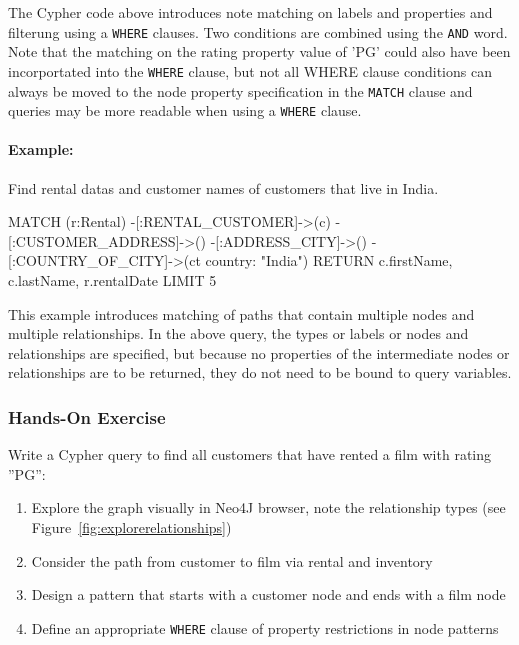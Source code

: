 The Cypher code above introduces note matching on labels and properties and filterung using a \texttt{WHERE} clauses. Two conditions are combined using the \texttt{AND} word. Note that the matching on the rating property value of 'PG' could also have been incorportated into the \texttt{WHERE} clause, but not all WHERE clause conditions can always be moved to the node property specification in the \texttt{MATCH} clause and queries may be more readable when using a \texttt{WHERE} clause. 

\paragraph*{Example:} Find rental datas and customer names of customers that live in India.

\begin{samepage}
\begin{cyphercode}
MATCH (r:Rental) 
        -[:RENTAL_CUSTOMER]->(c) 
        -[:CUSTOMER_ADDRESS]->() 
        -[:ADDRESS_CITY]->()
        -[:COUNTRY_OF_CITY]->(ct {country: "India"})
RETURN c.firstName, c.lastName, r.rentalDate LIMIT 5
\end{cyphercode}
\end{samepage}

This example introduces matching of paths that contain multiple nodes and multiple relationships. In the above query, the types or labels or nodes and relationships are specified, but because no properties of the intermediate nodes or relationships are to be returned, they do not need to be bound to query variables.


\begin{tcolorbox}[colback=code]
\subsubsection*{Hands-On Exercise}

Write a Cypher query to find all customers that have rented a film with rating ''PG'':

\begin{enumerate}
  \item Explore the graph visually in Neo4J browser, note the relationship types (see Figure~\ref{fig:explorerelationships})
  \item Consider the path from customer to film via rental and inventory
  \item Design a pattern that starts with a customer node and ends with a film node
  \item Define an appropriate \texttt{WHERE} clause of property restrictions in node patterns
\end{enumerate}
\end{tcolorbox}

